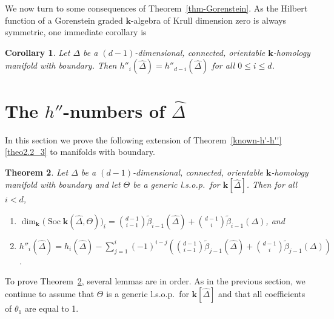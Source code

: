 \documentclass[10pt]{amsart}
\newtheorem{theorem}{Theorem}[section]
\newtheorem{coro}[theorem]{Corollary}
\theoremstyle{definition}
\DeclareMathOperator{\Soc}{Soc}
\newcommand{\complet}[1]{\hat{#1}}
\newcommand{\field}{\mathbf{k}}
\begin{document}
We now turn to some consequences of Theorem~\ref{thm-Gorenstein}. As the Hilbert function of a Gorenstein graded $\field$-algebra of Krull dimension zero is always symmetric, one immediate corollary is
\begin{coro} \label{symmetry}
Let $\Delta$ be a $(d-1)$-dimensional, connected, orientable $\field$-homology manifold with boundary. Then 
$h''_i(\complet{\Delta})=h''_{d-i}(\complet{\Delta})$ for all $0\leq i \leq d$.
\end{coro}

\setcounter{section}{3}
\section{The \texorpdfstring{$h''$}{h''}-numbers of  \texorpdfstring{$\hat{\Delta}$}{Delta}} \label{sec:h''-and-socles}
In this section we prove the following extension of Theorem~\ref{known-h'-h''}\eqref{theo2.2_3} to manifolds with boundary. 

\begin{theorem} \label{soc-and-h''}
Let $\Delta$ be a $(d-1)$-dimensional, connected, orientable $\field$-homology manifold with boundary and let $\Theta$ be a generic l.s.o.p.~for $\field[\complet{\Delta}]$. Then for all $i<d$,
\begin{enumerate}
\item\label{theo4.1_1} $\dim_\field \big(\Soc \field(\complet{\Delta},\Theta)\big)_i=\binom{d-1}{i-1}\tilde{\beta}_{i-1}(\complet{\Delta})+\binom{d-1}{i}\tilde{\beta}_{i-1}(\Delta)$, and
\item\label{theo4.1_2} $h''_i(\complet{\Delta})=h_i(\complet{\Delta})-\sum_{j=1}^{i}(-1)^{i-j}\left(\binom{d-1}{i-1}\tilde{\beta}_{j-1}(\complet{\Delta})+\binom{d-1}{i}\tilde{\beta}_{j-1}(\Delta)\right)$.
\end{enumerate}
\end{theorem}
\setcounter{theorem}{2}
To prove Theorem~\ref{soc-and-h''}, several lemmas are in order. As in the previous section, we continue to assume that $\Theta$ is a generic l.s.o.p.~for $\field[\complet{\Delta}]$ and that all coefficients of $\theta_1$ are equal to 1.
\end{document}
